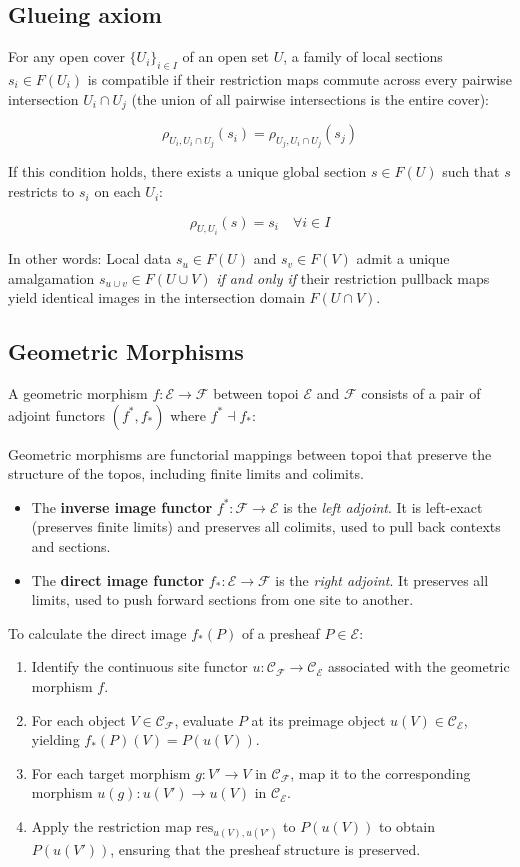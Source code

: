 \documentclass[11pt]{article}
\begin{document}
\subsection{Glueing axiom}
For any open cover $\{U_i\}_{i \in I}$ of an open set $U$, a family of local sections $s_i \in F(U_i)$ is compatible if their restriction maps commute across every pairwise intersection $U_i \cap U_j$ (the union of all pairwise intersections is the entire cover):

\[ \rho_{U_i, U_i \cap U_j}(s_i) = \rho_{U_j, U_i \cap U_j}(s_j) \]

If this condition holds, there exists a unique global section $s \in F(U)$ such that $s$ restricts to
$s_i$ on each $U_i$:

\[ \rho_{U, U_i}(s) = s_i \quad \forall i \in I \]

In other words:
Local data $s_u \in F(U)$ and $s_v \in F(V)$ admit a unique amalgamation $s_{u \cup v} \in F(U \cup V)$ \emph{if and only if} their restriction pullback maps yield identical images in the intersection domain $F(U \cap V)$.

\subsection{Geometric Morphisms}
A geometric morphism $f: \mathcal{E} \to \mathcal{F}$ between topoi $\mathcal{E}$ and $\mathcal{F}$ consists of a pair of adjoint functors $(f^*, f_*)$ where $f^* \dashv f_*$:

Geometric morphisms are functorial mappings between topoi that preserve the structure of the topos, including finite limits and colimits.

\begin{itemize}
    \item The \textbf{inverse image functor} $f^*: \mathcal{F} \to \mathcal{E}$ is the \emph{left adjoint}. It is left-exact (preserves finite limits) and preserves all colimits, used to pull back contexts and sections.
    \item The \textbf{direct image functor} $f_*: \mathcal{E} \to \mathcal{F}$ is the \emph{right adjoint}. It preserves all limits, used to push forward sections from one site to another.
\end{itemize}

To calculate the direct image $f_*(P)$ of a presheaf $P \in \mathcal{E}$:
\begin{enumerate}
    \item Identify the continuous site functor $u : \mathcal{C}_\mathcal{F} \to \mathcal{C}_\mathcal{E}$ associated with the geometric morphism $f$.
    \item For each object $V \in \mathcal{C}_\mathcal{F}$, evaluate $P$ at its preimage object $u(V) \in \mathcal{C}_\mathcal{E}$, yielding $f_*(P)(V) = P(u(V))$.
    \item For each target morphism $g : V' \to V$ in $\mathcal{C}_\mathcal{F}$, map it to the corresponding morphism $u(g) : u(V') \to u(V)$ in $\mathcal{C}_\mathcal{E}$.
    \item Apply the restriction map $\text{res}_{u(V), u(V')}$ to $P(u(V))$ to obtain $P(u(V'))$, ensuring that the presheaf structure is preserved.
\end{enumerate}
\end{document}

